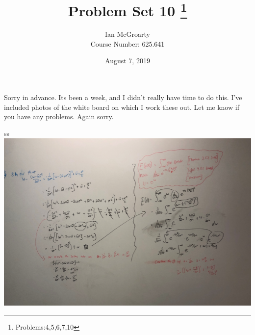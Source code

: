 \documentclass[12pt]{article}
\title{Problem Set 10 \thanks{Problems:4,5,6,7,10}}
\author{Ian McGroarty \\
	Course Number: 625.641}
\date{August 7, 2019}
\newenvironment{problem}[3][Problem]{\begin{trivlist}
\item[\hskip \labelsep {\bfseries #1}\hskip \labelsep {\bfseries #2.}]}{\end{trivlist}}
\begin{document}
\maketitle

Sorry in advance. Its been a week, and I didn't really have time to do this. I've included photos of the white board on which I work these out. Let me know if you have any problems. Again sorry. 
\newpage
\begin{problem}{4}.ss \\

\includegraphics[width=\textwidth ]{mod10p4c.png}

  \end{problem}
  \newpage
\end{document}
